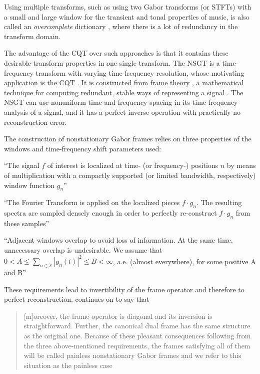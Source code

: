 \documentclass[report.tex]{subfiles}
\begin{document}
Using multiple transforms, such as using two Gabor transforms (or STFTs) with a small and large window for the transient and tonal properties of music, is also called an \textit{overcomplete} dictionary \parencite{dictionary}, where there is a lot of redundancy in the transform domain.

The advantage of the CQT over such approaches is that it contains these desirable transform properties in one single transform. The NSGT is a time-frequency transform with varying time-frequency resolution, whose motivating application is the CQT \parencite{jaillet, balazs}. It is constructed from frame theory \parencite{frametheory}, a mathematical technique for computing redundant, stable ways of representing a signal \parencite{framesintro}. The NSGT can use nonuniform time and frequency spacing in its time-frequency analysis of a signal, and it has a perfect inverse operation with practically no reconstruction error.

The construction of nonstationary Gabor frames relies on three properties of the windows and time-frequency shift parameters used:
\begin{tight_itemize}
	\item
		``The signal $f$ of interest is localized at time- (or frequency-) positions $n$ by means of multiplication with a compactly supported (or limited bandwidth, respectively) window function $g_{n}$'' \parencite[2]{balazs}
	\item
		``The Fourier Transform is applied on the localized pieces $f \cdot g_{n}$. The resulting spectra are sampled densely enough in order to perfectly re-construct $f \cdot g_{n}$ from these samples'' \parencite[2]{balazs}
	\item
		``Adjacent windows overlap to avoid loss of information. At the same time, unnecessary overlap is undesirable. We assume that $0 < A \le \sum_{n \in \mathbb{Z}}|g_{n}(t)|^{2} \le B < \infty$, a.e. (almost everywhere), for some positive A and B'' \parencite[2]{balazs}
\end{tight_itemize}

These requirements lead to invertibility of the frame operator and therefore to perfect reconstruction. \citeauthor{balazs} continues on to say that

\begin{quote}
	[m]oreover, the frame operator is diagonal and its inversion is straightforward. Further, the canonical dual frame has the same structure as the original one. Because of these pleasant consequences following from the three above-mentioned requirements, the frames satisfying all of them will be called painless nonstationary Gabor frames and we refer to this situation as the painless case \parencite[1,482]{balazs}
\end{quote}
\end{document}
